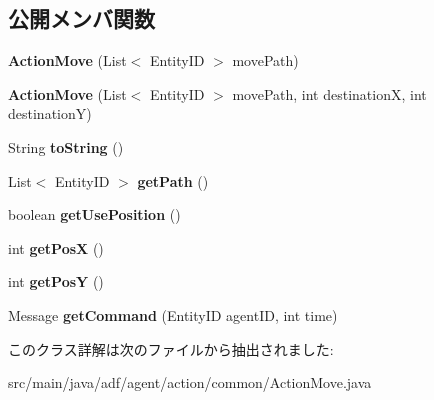 \subsection*{公開メンバ関数}
\begin{DoxyCompactItemize}
\item 
\hypertarget{classadf_1_1agent_1_1action_1_1common_1_1ActionMove_a446fb0a7f2d7ac5def8ccb4915e84443}{}\label{classadf_1_1agent_1_1action_1_1common_1_1ActionMove_a446fb0a7f2d7ac5def8ccb4915e84443} 
{\bfseries Action\+Move} (List$<$ Entity\+ID $>$ move\+Path)
\item 
\hypertarget{classadf_1_1agent_1_1action_1_1common_1_1ActionMove_aedc59794067e863a2881b623024f36eb}{}\label{classadf_1_1agent_1_1action_1_1common_1_1ActionMove_aedc59794067e863a2881b623024f36eb} 
{\bfseries Action\+Move} (List$<$ Entity\+ID $>$ move\+Path, int destinationX, int destinationY)
\item 
\hypertarget{classadf_1_1agent_1_1action_1_1common_1_1ActionMove_a73a448873ec5ef05f94369b7a0091183}{}\label{classadf_1_1agent_1_1action_1_1common_1_1ActionMove_a73a448873ec5ef05f94369b7a0091183} 
String {\bfseries to\+String} ()
\item 
\hypertarget{classadf_1_1agent_1_1action_1_1common_1_1ActionMove_a079ea88ac540e4c274d8590700843ed5}{}\label{classadf_1_1agent_1_1action_1_1common_1_1ActionMove_a079ea88ac540e4c274d8590700843ed5} 
List$<$ Entity\+ID $>$ {\bfseries get\+Path} ()
\item 
\hypertarget{classadf_1_1agent_1_1action_1_1common_1_1ActionMove_aaddb1fd9d8724f78dc645a534647de35}{}\label{classadf_1_1agent_1_1action_1_1common_1_1ActionMove_aaddb1fd9d8724f78dc645a534647de35} 
boolean {\bfseries get\+Use\+Position} ()
\item 
\hypertarget{classadf_1_1agent_1_1action_1_1common_1_1ActionMove_ab46a8688e7a400327e0709b5747227a3}{}\label{classadf_1_1agent_1_1action_1_1common_1_1ActionMove_ab46a8688e7a400327e0709b5747227a3} 
int {\bfseries get\+PosX} ()
\item 
\hypertarget{classadf_1_1agent_1_1action_1_1common_1_1ActionMove_a1e8adba10aa1ee1212e9be9e9a8fb4f8}{}\label{classadf_1_1agent_1_1action_1_1common_1_1ActionMove_a1e8adba10aa1ee1212e9be9e9a8fb4f8} 
int {\bfseries get\+PosY} ()
\item 
\hypertarget{classadf_1_1agent_1_1action_1_1common_1_1ActionMove_a0c0647b59ef2030d756dd8023acabf17}{}\label{classadf_1_1agent_1_1action_1_1common_1_1ActionMove_a0c0647b59ef2030d756dd8023acabf17} 
Message {\bfseries get\+Command} (Entity\+ID agent\+ID, int time)
\end{DoxyCompactItemize}


このクラス詳解は次のファイルから抽出されました\+:\begin{DoxyCompactItemize}
\item 
src/main/java/adf/agent/action/common/Action\+Move.\+java\end{DoxyCompactItemize}
